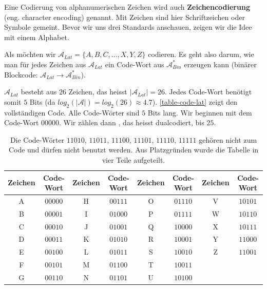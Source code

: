 Eine Codierung von alphanumerischen Zeichen wird auch \textbf{Zeichencodierung} (eng. character encoding) genannt. Mit Zeichen sind hier Schriftzeichen oder Symbole gemeint. Bevor wir uns drei Standards anschauen, zeigen wir die Idee mit einem  Alphabet.

\begin{example}
Als  möchten wir $\mathscr{A}_{Lat} = \{A, B, C, \dots, X, Y, Z\}$ codieren. Es geht also darum, wie man für jedes Zeichen aus $\mathscr{A}_{Lat}$ ein Code-Wort aus $\mathscr{A}_{Bin}^*$ erzeugen kann (binärer Blockcode: $\mathscr{A}_{Lat} \rightarrow \mathscr{A}_{Bin}^*$).

$\mathscr{A}_{Lat}$ besteht aus $26$ Zeichen, das heisst $|\mathscr{A}_{Lat}| = 26$. Jedes Code-Wort benötigt somit $5$ Bits (da $log_2(|\mathscr{A}|)=log_2(26)\approx4.7$). \autoref{table-code-lat} zeigt den vollständigen Code. Alle Code-Wörter sind $5$ Bits lang. Wir beginnen mit dem Code-Wort $00000$. Wir zählen dann , das heisst dualcodiert, bis $25$.

\begin{table}[htb]
\centering
\begin{tabular}{|c|c||c|c||c|c||c|c|}
\hline
\footnotesize
\textbf{Zeichen} & \footnotesize \textbf{Code-Wort} & \footnotesize \textbf{Zeichen} & \footnotesize \textbf{Code-Wort} & \footnotesize \textbf{Zeichen} & \footnotesize \textbf{Code-Wort} & \footnotesize \textbf{Zeichen} & \footnotesize \textbf{Code-Wort} \\ \hline
A & $00000$ & H & $00111$ & O & $01110$ & V & $10101$ \\ \hline
B & $00001$ & I & $01000$ & P & $01111$ & W & $10110$ \\ \hline
C & $00010$ & J & $01001$ & Q & $10000$ & X & $10111$ \\ \hline
D & $00011$ & K & $01010$ & R & $10001$ & Y & $11000$ \\ \hline
E & $00100$ & L & $01011$ & S & $10010$ & Z & $11001$ \\ \hline
F & $00101$ & M & $01100$ & T & $10011$ & & \\ \hline
G & $00110$ & N & $01101$ & U & $10100$ & & \\ \hline
\end{tabular}
\caption{Die Code-Wörter $11010$, $11011$, $11100$, $11101$, $11110$, $11111$ gehören nicht zum Code und dürfen nicht benutzt werden. Aus Platzgründen wurde die Tabelle in vier Teile aufgeteilt.}
\label{table-code-lat}
\end{table}

\end{example}

